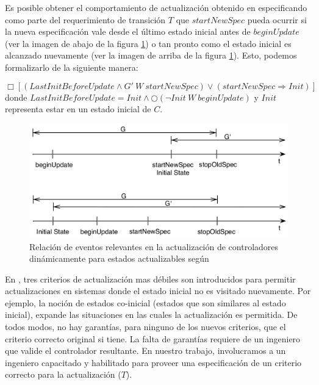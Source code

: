 Es posible obtener el comportamiento de actualización obtenido en \cite{6224401} especificando como parte del
requerimiento de transición $T$ que $startNewSpec$ pueda ocurrir si la nueva especificación vale desde el último estado
inicial antes de $beginUpdate$ (ver la imagen de abajo de la figura \ref{ghezzi}) o tan pronto como el estado inicial es
alcanzado nuevamente (ver la imagen de arriba de la figura \ref{ghezzi}). Esto, podemos formalizarlo de la siguiente manera:

\vspace{-1cm}
\begin{equation}
\label{ghezzi_formula}
\Box [(LastInitBeforeUpdate \wedge G'\ W\ startNewSpec) \lor (startNewSpec \Longrightarrow Init)]
\end{equation}
\noindent donde $LastInitBeforeUpdate = Init \wedge \bigcirc(\neg Init\ W\ beginUpdate)$ y $Init$ representa estar en un estado inicial de
$C$.


\begin{figure}
\centering
\includegraphics[scale=0.35]{img/Ghezzi.png}
\caption{Relación de eventos relevantes en la actualización de controladores dinámicamente para estados actualizables
según \cite{6224401}}
\label{ghezzi}
\end{figure}

En \cite{PanzicaLaManna:2013:FCC:2487336.2487349}, tres criterios de actualización mas débiles son introducidos para
permitir actualizaciones en sistemas donde el estado inicial no es visitado nuevamente. Por ejemplo, la noción de
estados co-inicial (estados que son similares al estado inicial), expande las situaciones en las cuales la actualización
es permitida. De todos modos, no hay garantías, para ninguno de los nuevos criterios, que el criterio correcto original
si tiene. La falta de garantías requiere de un ingeniero que valide el controlador resultante. En nuestro trabajo,
involucramos a un ingeniero capacitado y habilitado para proveer una especificación de un criterio correcto para la
actualización ($T$).

